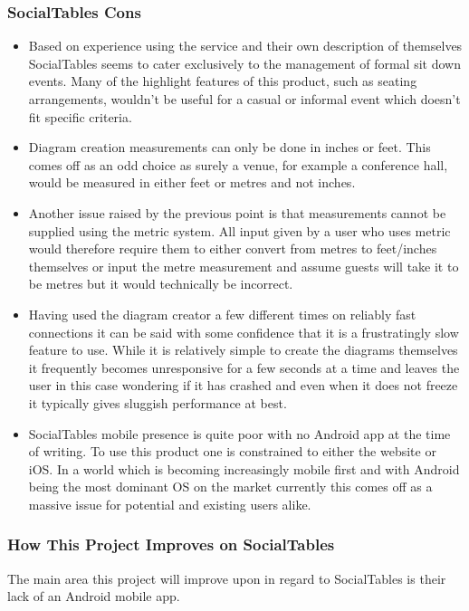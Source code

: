 \subsubsection{SocialTables Cons}

\begin{itemize}
    \item Based on experience using the service and their own description of themselves\cite{socialtablesaboutus} SocialTables seems to cater exclusively to the management of formal sit down events. Many of the highlight features of this product, such as seating arrangements, wouldn't be useful for a casual or informal event which doesn't fit specific criteria.
    \item Diagram creation measurements can only be done in inches or feet. This comes off as an odd choice as surely a venue, for example a conference hall, would be measured in either feet or metres and not inches.
    \item Another issue raised by the previous point is that measurements cannot be supplied using the metric system. All input given by a user who uses metric would therefore require them to either convert from metres to feet/inches themselves or input the metre measurement and assume guests will take it to be metres but it would technically be incorrect.
    \item Having used the diagram creator a few different times on reliably fast connections it can be said with some confidence that it is a frustratingly slow feature to use. While it is relatively simple to create the diagrams themselves it frequently becomes unresponsive for a few seconds at a time and leaves the user in this case wondering if it has crashed and even when it does not freeze it typically gives sluggish performance at best.
    \item SocialTables mobile presence is quite poor with no Android app at the time of writing. To use this product one is constrained to either the website or iOS. In a world which is becoming increasingly mobile first and with Android being the most dominant OS on the market currently this comes off as a massive issue for potential and existing users alike.
\end{itemize}

\subsubsection{How This Project Improves on SocialTables}

The main area this project will improve upon in regard to SocialTables is their lack of an Android mobile app. 


